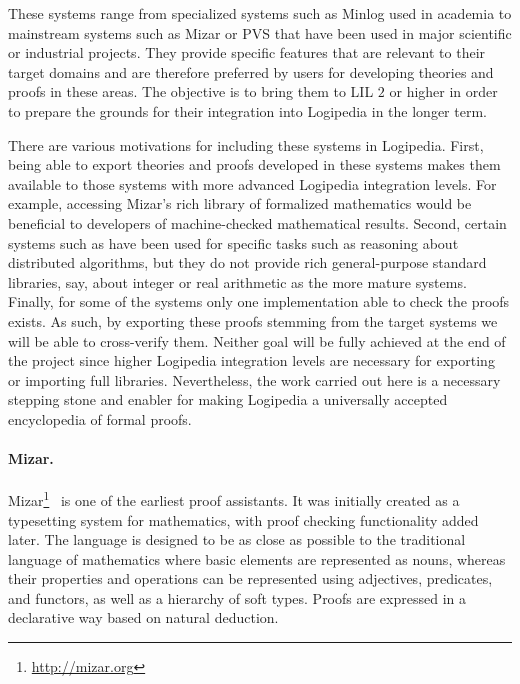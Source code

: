 These systems range from specialized systems such as Minlog
used in academia to mainstream systems such as Mizar or PVS that
have been used in major scientific or industrial projects. They
provide specific features that are relevant to their target domains
and are therefore preferred by users for developing theories and
proofs in these areas.  The objective is to bring them to
LIL $2$ or higher in order to prepare the grounds for their integration
into Logipedia in the longer term.


There are various motivations for including these systems in
Logipedia. First, being able to export theories and proofs developed
in these systems makes them available to those systems with more
advanced Logipedia integration levels. For example, accessing Mizar's
rich library of formalized mathematics would be beneficial to
developers of machine-checked mathematical results. Second, certain
systems such as \tlaplus have been used for specific tasks such as reasoning
about distributed algorithms, but they do not provide rich
general-purpose standard libraries, say, about integer or real
arithmetic as the more mature systems. Finally, for some of the
systems only one implementation able to check the proofs exists. As
such, by exporting these proofs stemming from the target systems we
will be able to cross-verify them.  Neither goal will be fully achieved at the end of the
project since higher Logipedia integration levels are necessary for
exporting or importing full libraries. Nevertheless, the work carried
out here is a necessary stepping stone and enabler
for making Logipedia a universally accepted encyclopedia of formal
proofs.

\paragraph*{Mizar.}
Mizar\footnote{\url{http://mizar.org}}~\cite{banczerek:mizar} is one of the
earliest proof assistants. It was initially created as a typesetting system for
mathematics, with proof checking functionality added later. The language is
designed to be as close as possible to the traditional language of mathematics
where basic elements are represented as nouns, whereas their properties and
operations can be represented using adjectives, predicates, and functors, as
well as a hierarchy of soft types. Proofs are expressed in a declarative way
based on natural deduction.

